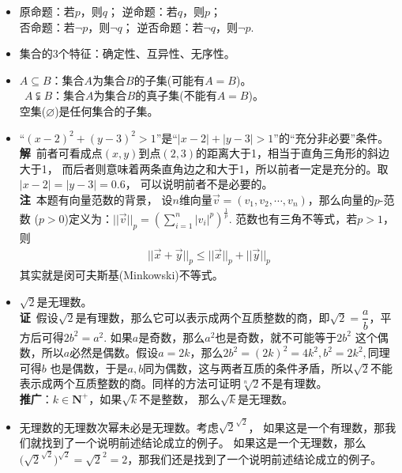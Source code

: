 \begin{itemize}[leftmargin=\inteval{\myitemleftmargin}pt,itemsep=
   \inteval{\myitemitempsep}pt,topsep=\inteval{\myitemtopsep}pt]
\item 原命题：若$ p $，则$ q $；
逆命题：若$ q $，则$ p $；\\
否命题：若$ \neg p $，则$ \neg q $；
逆否命题：若$ \neg q $，则$ \neg p $. 

\item 集合的3个特征：确定性、互异性、无序性。

\item $ A \subseteq B $：集合$ A $为集合$ B $的子集(可能有$ A=B $)。\\
$ \ \ A \subsetneqq B $：集合$ A $为集合$ B $的真子集(不能有$ A=B $)。\\
空集($ \varnothing $)是任何集合的子集。

\item “$ (x-2)^2+(y-3)^2>1 $”是“$ |x-2|+|y-3|>1 $”的“充分非必要”条件。\\
\textbf{解}\ 前者可看成点$ (x,y) $到点$ (2,3) $的距离大于1，相当于直角三角形的斜边大于1，
而后者则意味着两条直角边之和大于1，所以前者一定是充分的。取$ |x-2|=|y-3|=0.6 $，
可以说明前者不是必要的。\\
\textbf{注}\ 本题有向量范数的背景，
设$ n $维向量$ \vec{v}=(v_1,v_2,\cdots,v_n) $，那么向量的$ p $-范数
($ p > 0 $)定义为：$ ||\vec{v}||_p
=\left(\sum\limits_{i=1}^n |v_i|^p\right)^{\frac{1}{p}} $. 
范数也有三角不等式，若$ p>1 $，则
\begin{align*}
    ||\vec{x}+\vec{y}||_p\leq
    ||\vec{x}||_p+||\vec{y}||_p
\end{align*}
其实就是闵可夫斯基(Minkowski)不等式。

\item $ \sqrt{2} $是无理数。\\
\textbf{证}\ 假设$ \sqrt{2} $是有理数，那么它可以表示成两个互质整数的商，即$ \sqrt{2}=
\dfrac{a}{b} $，平方后可得$ 2b^2=a^2 $. 如果$ a $是奇数，那么$ a^2 $也是奇数，就不可能等于$ 2b^2 $
这个偶数，所以$ a $必然是偶数。假设$ a=2k $，那么$ 2b^2=(2k)^2=4k^2,b^2=2k^2, $同理可得$ b $
也是偶数，于是$ a,b $同为偶数，这与两者互质的条件矛盾，所以$ \sqrt{2} $不能表示成两个互质整数的商。同样的方法可证明$ \sqrt[n]{2} $不是有理数。\\
\textbf{推广}：$ k\in \textbf{N}^+ $，如果$ \sqrt{k} $不是整数，
那么$ \sqrt{k} $是无理数。

\item 无理数的无理数次幂未必是无理数。考虑$\sqrt{2}^{\sqrt{2}}$，
如果这是一个有理数，那我们就找到了一个说明前述结论成立的例子。
如果这是一个无理数，那么$ \Big(\sqrt{2}^{\sqrt{2}}\Big)^{\sqrt{2}}
=\sqrt{2}^2=2$，那我们还是找到了一个说明前述结论成立的例子。


\end{itemize}
